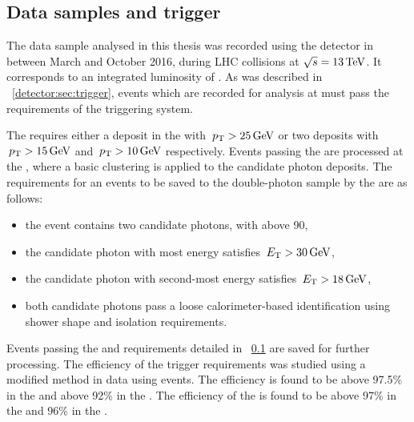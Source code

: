 \subsection{Data samples and trigger} %
\label{sec:reco:data}

The data sample analysed in this thesis was recorded using the \CMS detector in between March and October 2016, during \pp LHC collisions at $\sqrt{s}=13\,\text{Te\hspace{-.08em}V}$. It corresponds to an integrated luminosity of \totaldatatwentysixteen\ifb. As was described in \Sec~\ref{detector:sec:trigger}, events which are recorded for analysis at \CMS must pass the requirements of the triggering system. 

The \LI requires either a deposit in the \ECAL with $\,p_\text{T}>25\,\text{Ge\hspace{-.08em}V}$ or two deposits with $\,p_\text{T}>15\,\text{Ge\hspace{-.08em}V}$ and $\,p_\text{T}>10\,\text{Ge\hspace{-.08em}V}$ respectively. Events passing the \LI are processed at the \HLT, where a basic clustering is applied to the candidate photon deposits. The requirements for an events to be saved to the double-photon sample by the \HLT are as follows:

\begin{itemize}
\item the event contains two candidate photons, with \mgg above 90\GeV,
\item the candidate photon with most energy satisfies $\,E_\text{T} >30\,\text{Ge\hspace{-.08em}V}$, 
\item the candidate photon with second-most energy satisfies $\,E_\text{T} >18\,\text{Ge\hspace{-.08em}V}$,
\item both candidate photons pass a loose calorimeter-based identification using shower shape and isolation requirements.
\end{itemize}

Events passing the \LI and \HLT requirements detailed in \Sec~\ref{sec:reco:data} are saved for further processing. The efficiency of the trigger requirements was studied using a modified \TagAndProbe method in data using \Zee events. The \LI efficiency is found to be above 97.5\% in the \EB and above 92\% in the \EE. The efficiency of the \HLT is found to be above 97\% in the \EB and 96\% in the \EE. %



